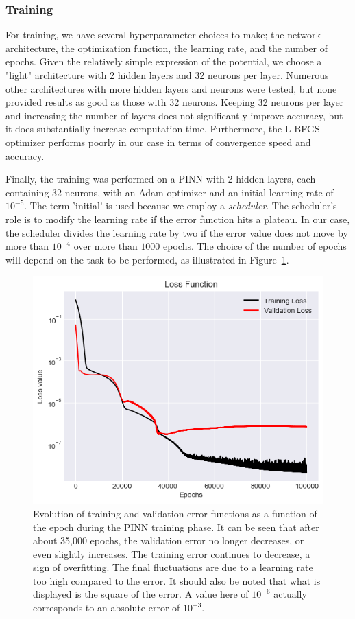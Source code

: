 \subsubsection{Training}

For training, we have several hyperparameter choices to make; the network architecture, the optimization function, the learning rate, and the number of epochs. Given the relatively simple expression of the potential, we choose a "light" architecture with 2 hidden layers and 32 neurons per layer. Numerous other architectures with more hidden layers and neurons were tested, but none provided results as good as those with 32 neurons. Keeping 32 neurons per layer and increasing the number of layers does not significantly improve accuracy, but it does substantially increase computation time. Furthermore, the L-BFGS optimizer performs poorly in our case in terms of convergence speed and accuracy.

Finally, the training was performed on a PINN with 2 hidden layers, each containing 32 neurons, with an Adam optimizer and an initial learning rate of $10^{-5}$. The term 'initial' is used because we employ a \emph{scheduler}. The scheduler's role is to modify the learning rate if the error function hits a plateau. In our case, the scheduler divides the learning rate by two if the error value does not move by more than $10^{-4}$ over more than $1000$ epochs. The choice of the number of epochs will depend on the task to be performed, as illustrated in Figure~\ref{fig:losses-hernquist}.

\begin{figure}
    \centering
    \includegraphics[width=\textwidth]{imgs/error-hernquist.png}
    \caption{Evolution of training and validation error functions as a function of the epoch during the PINN training phase. It can be seen that after about 35,000 epochs, the validation error no longer decreases, or even slightly increases. The training error continues to decrease, a sign of overfitting. The final fluctuations are due to a learning rate too high compared to the error. It should also be noted that what is displayed is the square of the error. A value here of $10^{-6}$ actually corresponds to an absolute error of $10^{-3}$.}
    \label{fig:losses-hernquist}
\end{figure}

